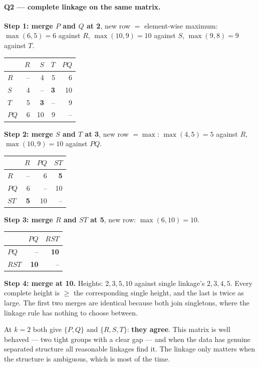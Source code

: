 \documentclass[11pt]{article}
\begin{document}
\paragraph{Q2 --- complete linkage on the same matrix.}
\textbf{Step 1: merge $P$ and $Q$ at 2}, new row $=$ element-wise maximum:
$\max(6,5) = 6$ against $R$, $\max(10,9) = 10$ against $S$, $\max(9,8) = 9$
against $T$.
\begin{center}\small
\begin{tabular}{lrrrr}
  \toprule
  & $R$ & $S$ & $T$ & $PQ$ \\
  \midrule
  $R$  & -- & 4 & 5 & 6 \\
  $S$  & 4  & --& \textbf{3} & 10 \\
  $T$  & 5  & \textbf{3} & --& 9 \\
  $PQ$ & 6  & 10 & 9 & -- \\
  \bottomrule
\end{tabular}
\end{center}
\textbf{Step 2: merge $S$ and $T$ at 3}, new row $= \max$: $\max(4,5) = 5$
against $R$, $\max(10,9) = 10$ against $PQ$.
\begin{center}\small
\begin{tabular}{lrrr}
  \toprule
  & $R$ & $PQ$ & $ST$ \\
  \midrule
  $R$  & -- & 6 & \textbf{5} \\
  $PQ$ & 6  & --& 10 \\
  $ST$ & \textbf{5}  & 10 & -- \\
  \bottomrule
\end{tabular}
\end{center}
\textbf{Step 3: merge $R$ and $ST$ at 5}, new row: $\max(6, 10) = 10$.
\begin{center}\small
\begin{tabular}{lrr}
  \toprule
  & $PQ$ & $RST$ \\
  \midrule
  $PQ$  & -- & \textbf{10} \\
  $RST$ & \textbf{10} & -- \\
  \bottomrule
\end{tabular}
\end{center}
\textbf{Step 4: merge at 10.} Heights: $2, 3, 5, 10$ against single linkage's
$2, 3, 4, 5$. Every complete height is $\ge$ the corresponding single height,
and the last is twice as large. The first two merges are identical because
both join singletons, where the linkage rule has nothing to choose between.

At $k = 2$ both give $\{P,Q\}$ and $\{R,S,T\}$: \textbf{they agree}. This
matrix is well behaved --- two tight groups with a clear gap --- and when the
data has genuine separated structure all reasonable linkages find it. The
linkage only matters when the structure is ambiguous, which is most of the
time.
\end{document}
